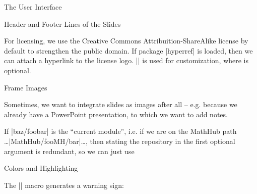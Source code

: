 \begin{sfragment}[id=sec:user]{The User Interface}
\begin{sfragment}[id=sec:user:headfootlines]{Header and Footer Lines of the Slides}
\begin{function}{\setlicensing}
  For licensing, we use the Creative Commons Attribuition-ShareAlike license by default to
  strengthen the public domain. If package |hyperref| is loaded, then we can attach a
  hyperlink to the license logo. || is used
  for customization, where  is optional.
\end{function}
\end{sfragment}

\begin{sfragment}[id=sec:user:frameimage]{Frame Images}

Sometimes, we want to integrate slides as images after all -- e.g. because we already
have a PowerPoint presentation, to which we want to add \sTeX notes.


If |baz/foobar| is the ``current module'', i.e. if we are on the \textsf{MathHub} path
\ldots|MathHub/fooMH/bar|\ldots, then stating the repository in the first optional
argument is redundant, so we can just use
\begin{latexcode}
\end{latexcode}
\end{sfragment}

\begin{sfragment}[id=sec:user:highlighting]{Colors and Highlighting}
\begin{function}{\textwarning}
  The |\textwarning| macro generates a warning sign: \textwarning
\end{function}
\end{sfragment}


\end{sfragment}
